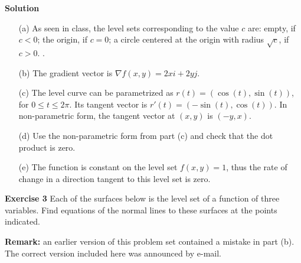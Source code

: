\documentclass[12pt,oneside]{exam}
\newenvironment{exercise}[1]{\vspace{.1in}\noindent\textbf{Exercise #1 \hspace{.05em}}}{}
\newenvironment{newsolution}{\vspace{.1in}\noindent\textbf{Solution \hspace{.05em}}}{}
\begin{document}
\begin{newsolution}
\begin{itemize}
\item[(a)] As seen in class, the level sets corresponding to the value $c$ are: empty, if $c<0$; the origin, if $c =0$; a circle centered at the origin with radius $\sqrt{c}$, if $c>0$. . 
\item[(b)] The gradient vector is $\nabla f (x,y)= 2xi + 2yj$. 
\item[(c)] The level curve can be parametrized as $r(t)=(\cos(t), \sin(t))$, for $0 \leq t \leq 2\pi$. Its tangent vector is $r'(t)=(-\sin(t), \cos(t))$. In non-parametric form, the tangent vector at $(x,y)$ is $(-y,x)$. 
\item[(d)] Use the non-parametric form from part (c) and check that the dot product is zero. 
\item[(e)] The function is constant on the level set $f(x,y)=1$, thus the rate of change in a direction tangent to this level set is zero. 
\end{itemize}
\end{newsolution} 

\begin{exercise}{3}
Each of the surfaces below is the level set of a function of three variables. Find equations of the normal lines to these surfaces at the points indicated. 
\end{exercise}

\textbf{Remark:} an earlier version of this problem set contained a mistake in part (b). The correct version included here was announced by e-mail.
\end{document}
